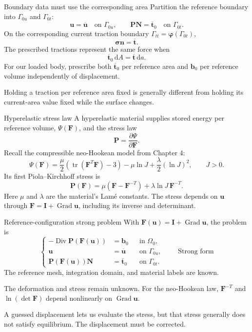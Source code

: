 \documentclass[11pt,aspectratio=169]{beamer}
\newcommand{\bu}{\bm u}
\newcommand{\bn}{\bm n}
\newcommand{\bN}{\bm N}
\newcommand{\bb}{\bm b}
\newcommand{\bt}{\bm t}
\newcommand{\bI}{\bm I}
\newcommand{\bF}{\bm F}
\newcommand{\bP}{\bm P}
\newcommand{\bsig}{\bm\sigma}
\newcommand{\bphi}{\bm\varphi}
\newcommand{\Grad}{\operatorname{Grad}}
\newcommand{\Div}{\operatorname{Div}}
\DeclareMathOperator{\tr}{tr}
\begin{document}
\begin{frame}{Boundary data must use the corresponding area}
Partition the reference boundary into $\Gamma_{0u}$ and $\Gamma_{0t}$:
\[
\bu=\overline{\bu}\quad\text{on }\Gamma_{0u},
\qquad
\bP\bN=\overline{\bt}_0\quad\text{on }\Gamma_{0t}.
\]
On the corresponding current traction boundary
$\Gamma_{tt}=\bphi(\Gamma_{0t})$,
\[
\bsig\bn=\overline{\bt}.
\]
The prescribed tractions represent the same force when
\[
\boxed{
\overline{\bt}_0\,\mathrm dA
=\overline{\bt}\,\mathrm da.
}
\]
For our loaded body, prescribe both $\overline{\bt}_0$ per reference area
and $\bb_0$ per reference volume independently of displacement.

Holding a traction per reference area fixed is generally different from
holding its current-area value fixed while the surface changes.
\end{frame}

\begin{frame}{Hyperelastic stress law}
A hyperelastic material supplies stored energy per reference volume,
$\Psi(\bF)$, and the stress law
\[
\bP=\frac{\partial\Psi}{\partial\bF}.
\]
Recall the compressible neo-Hookean model from Chapter 4:
\[
\Psi(\bF)
=\frac\mu2(\tr(\bF^T\bF)-3)
-\mu\ln J+\frac\lambda2(\ln J)^2,
\qquad J>0.
\]
Its first Piola--Kirchhoff stress is
\[
\boxed{\bP(\bF)
=\mu(\bF-\bF^{-T})+\lambda\ln J\,\bF^{-T}.}
\]
Here $\mu$ and $\lambda$ are the material's Lam\'e constants.
The stress depends on $\bu$ through $\bF=\bI+\Grad\bu$,
including its inverse and determinant.
\end{frame}

\begin{frame}{Reference-configuration strong problem}
With $\bF(\bu)=\bI+\Grad\bu$, the problem is
\[
\left\{\begin{aligned}
-\Div\bP(\bF(\bu))&=\bb_0&&\text{in }\Omega_0,\\
\bu&=\overline{\bu}&&\text{on }\Gamma_{0u},\\
\bP(\bF(\bu))\bN&=\overline{\bt}_0&&\text{on }\Gamma_{0t}.
\end{aligned}\right.
\qquad\text{Strong form}
\]
The reference mesh, integration domain, and material labels are known.

The deformation and stress remain unknown. For the neo-Hookean law,
$\bF^{-T}$ and $\ln(\det\bF)$ depend nonlinearly on $\Grad\bu$.

A guessed displacement lets us evaluate the stress, but that stress generally
does not satisfy equilibrium. The displacement must be corrected.
\end{frame}
\end{document}
